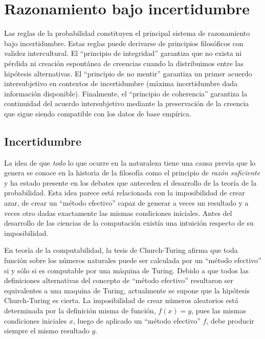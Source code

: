 \documentclass[a4paper,11pt]{book}
\theoremstyle{definition}
\begin{document}
%

\section{Razonamiento bajo incertidumbre}\label{sec:principios_interculturales}

Las reglas de la probabilidad constituyen el principal sistema de razonamiento bajo incertidumbre.
%
Estas reglas puede derivarse de principios filosóficos con validez intercultural.
%
El ``principio de integridad'' garantiza que no exista ni pérdida ni creación espontánea de creencias cuando la distribuimos entre las hipótesis alternativas.
%
El ``principio de no mentir'' garantiza un primer acuerdo intersubjetivo en contextos de incertidumbre (máxima incertidumbre dada información disponible).
%
Finalmente, el ``principio de coherencia'' garantiza la continuidad del acuerdo intersubjetivo mediante la preservación de la creencia que sigue siendo compatible con los datos de base empírica.

\subsection{Incertidumbre}

La idea de que \emph{todo} lo que ocurre en la naturaleza tiene una causa previa que lo genera se conoce en la historia de la filosofía como el principio de \emph{razón suficiente} y ha estado presente en los debates que anteceden el desarrollo de la teoría de la probabilidad.
%
%
Esta idea parece está relacionada con la imposibilidad de crear azar, de crear un ``método efectivo'' capaz de generar a veces un resultado y a veces otro dadas exactamente las mismas condiciones iniciales.
%
Antes del desarrollo de las ciencias de la computación existía una intuición respecto de su imposibilidad.


En teoría de la computabilidad, la tesis de Church-Turing afirma que toda función sobre los números naturales puede ser calculada por un ``método efectivo'' si y sólo si es computable por una máquina de Turing.
%
Debido a que todos las definiciones alternativas del concepto de ``método efectivo'' resultaron ser equivalentes a una maquina de Turing, actualmente se supone que la hipótesis Church-Turing es cierta.
%
La imposibilidad de crear números aleatorios está determinada por la definición misma de función, $f(x) = y$, pues las mismas condiciones iniciales $x$, luego de aplicado un ``método efectivo'' $f$, debe producir siempre el mismo resultado $y$.
\end{document}
